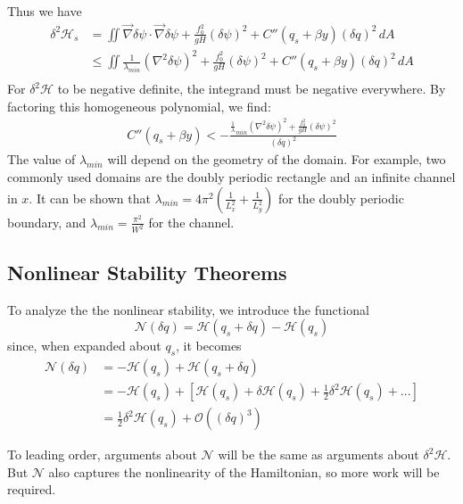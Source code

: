 \documentclass[12pt]{article}
\begin{document}
{{{            Thus we have
            \begin{align*}
                \delta^2\mathcal{H}_s
                &= \iint \vec\nabla \delta \psi \cdot \vec \nabla \delta \psi + \frac{f_0^2}{gH} (\delta \psi)^2+  C''(q_s + \beta y) (\delta q)^2  \, dA \\
                &\le \iint \frac{1}{\lambda_{min}}(\nabla^2\delta\psi)^2 + \frac{f_0^2}{gH} (\delta \psi)^2+  C''(q_s + \beta y) (\delta q)^2  \, dA \\
            \end{align*}
            For $\delta^2\mathcal{H}$ to be negative definite, the integrand must be negative everywhere. By factoring this homogeneous polynomial, we find:
            \begin{align*}
                C''(q_s + \beta y) < -\frac{\frac1\lambda_{min}(\nabla^2\delta\psi)^2 + \frac{f_0^2}{gH}(\delta\psi)^2}{(\delta q)^2}
            \end{align*}
            The value of $\lambda_{min}$ will depend on the geometry of the domain. For example, two commonly used domains are the doubly periodic rectangle and an infinite channel in $x$.
            It can be shown that $\lambda_{min} = 4\pi^2(\frac1{L_x^2} + \frac1{L_y^2})$ for the doubly periodic boundary, and $\lambda_{min} = \frac{\pi^2}{W^2}$ for the channel.
        }
    }

    \subsection{Nonlinear Stability Theorems}{
        To analyze the the nonlinear stability, we introduce the functional
        $$
        \mathcal{N}(\delta q)  = \mathcal{H}(q_s + \delta q) - \mathcal{H}(q_s)
        $$
        since, when expanded about $q_s$, it becomes
        \begin{align*}
            \mathcal{N}(\delta q)
            &= - \mathcal{H}(q_s) + \mathcal{H}(q_s + \delta q) \\
            & = - \mathcal{H}(q_s) + \left[ \mathcal{H}(q_s) + \delta \mathcal{H}(q_s)+ \frac12 \delta^2 \mathcal{H}(q_s) + ... \right] \\
            &= \frac12 \delta^2 \mathcal{H}(q_s) + \mathcal{O}((\delta q)^3)
        \end{align*}

        To leading order, arguments about $\mathcal{N}$ will be the same as arguments about $\delta^2 \mathcal{H}$. But $\mathcal{N}$ also captures the nonlinearity of the Hamiltonian, so more work will be required.

}}
\end{document}
